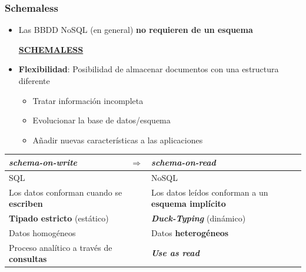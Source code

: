 \documentclass[14pt]{beamer}
\begin{document}
\begin{frame}
  \frametitle{Schemaless}
\begin{itemize}
\item Las BBDD NoSQL (en general) {\bf no requieren de un esquema}
\begin{alertblock}{}
  \centering
  \href{https://farm6.staticflickr.com/5483/29931060254_109e3e36da_o_d.jpg}{\bf
    SCHEMALESS}
\end{alertblock}
\item {\bf Flexibilidad}: Posibilidad de almacenar documentos con una
  estructura diferente
\begin{itemize}
\item Tratar información incompleta
\item Evolucionar la base de datos/esquema
\item Añadir nuevas características a las aplicaciones
\end{itemize}
\end{itemize}

\framebreak

\begin{small}
\begin{tabular}{p{}cp{}}
{\bfseries\itshape schema-on-write}&$\Rightarrow$&{\bfseries\itshape
                                                   schema-on-read}\\
\midrule
\rowcolor{blue!20} SQL&&NoSQL\\
\rowcolor{blue!15} Los datos conforman cuando se {\bf escriben}&&Los datos leídos conforman a
                                               un {\bf esquema implícito}\\
\rowcolor{blue!20} {\bf Tipado estricto} (estático) && {\bfseries\itshape Duck-Typing}
                                    (dinámico) \\
\rowcolor{blue!15}  Datos homogéneos && Datos {\bf heterogéneos}\\
\rowcolor{blue!20} Proceso analítico a través de {\bf consultas} && {\bfseries\itshape Use as read}\\
\end{tabular}
\end{small}


\end{frame}
\end{document}
